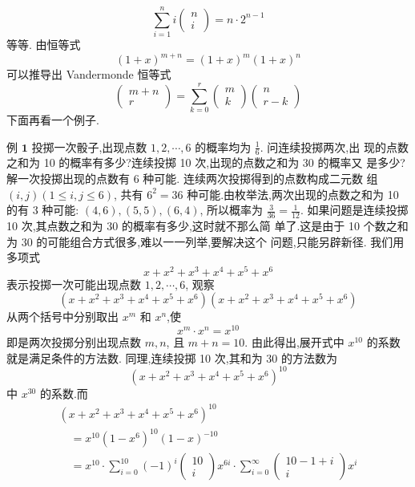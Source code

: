 \documentclass{report}
\begin{document}
$$
\sum_{i=1}^{n} i\left(\begin{array}{l}
n \\ i
\end{array}\right) = n \cdot 2^{n-1}
$$
等等.
由恒等式
$$
(1+x)^{m+n}=(1+x)^{m}(1+x)^{n}
$$
可以推导出 Vandermonde 恒等式
$$
\left(\begin{array}{c}
m+n \\ r
\end{array}\right)=\sum_{k=0}^{r}\left(\begin{array}{c}
m \\ k
\end{array}\right)\left(\begin{array}{c}
n \\ r-k
\end{array}\right)
$$
下面再看一个例子.

例 $\mathbf{1}$ 投掷一次骰子,出现点数 $1,2, \cdots, 6$ 的概率均为 $\frac{1}{6} .$ 问连续投掷两次,出 现的点数之和为 10 的概率有多少?连续投掷 10 次,出现的点数之和为 30 的概率又 是多少?
解一次投掷出现的点数有 6 种可能. 连续两次投掷得到的点数构成二元数 组 $(i, j)(1 \leqslant i, j \leqslant 6)$, 共有 $6^{2}=36$ 种可能.由枚举法,两次出现的点数之和为 10 的有 3 种可能: $(4,6),(5,5),(6,4)$, 所以概率为 $\frac{3}{36}=\frac{1}{12}$.
如果问题是连续投掷 10 次,其点数之和为 30 的概率有多少,这时就不那么简 单了.这是由于 10 个数之和为 30 的可能组合方式很多,难以一一列举,要解决这个 问题,只能另辟新径.
我们用多项式
$$
x+x^{2}+x^{3}+x^{4}+x^{5}+x^{6}
$$
表示投掷一次可能出现点数 $1,2, \cdots, 6$, 观察
$$
\left(x+x^{2}+x^{3}+x^{4}+x^{5}+x^{6}\right)\left(x+x^{2}+x^{3}+x^{4}+x^{5}+x^{6}\right)
$$
从两个括号中分别取出 $x^{m}$ 和 $x^{n}$,使
$$
x^{m} \cdot x^{n}=x^{10}
$$
即是两次投掷分别出现点数 $m, n$, 且 $m+n=10 .$ 由此得出,展开式中 $x^{10}$ 的系数 就是满足条件的方法数.
同理,连续投掷 10 次,其和为 30 的方法数为
$$
\left(x+x^{2}+x^{3}+x^{4}+x^{5}+x^{6}\right)^{10}
$$
中 $x^{30}$ 的系数.而
$$
\begin{array}{l}
\left(x+x^{2}+x^{3}+x^{4}+x^{5}+x^{6}\right)^{10} \\
\quad=x^{10}\left(1-x^{6}\right)^{10}(1-x)^{-10} \\
\quad=x^{10} \cdot \sum_{i=0}^{10}(-1)^{i}\left(\begin{array}{c}
10 \\ i
\end{array}\right) x^{6 i} \cdot \sum_{i=0}^{\infty}\left(\begin{array}{c}
10-1+i \\ i
\end{array}\right) x^{i}
\end{array}
$$
\end{document}
